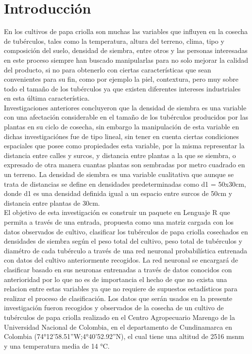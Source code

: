 

\chapter*{Introducci\'on}

En los cultivos de papa criolla son muchas las variables que influyen en la cosecha de tub\'erculos, tales como la temperatura, altura del terreno, clima, tipo y composici\'on del suelo, densidad de siembra, entre otros y las personas interesadas en este proceso siempre han buscado manipularlas para no solo mejorar la calidad del producto, si no para obtenerlo con ciertas caracter\'isticas que sean convenientes para su fin, como por ejemplo la piel, contextura, pero muy sobre todo el tama\~no de los tub\'erculos ya que existen diferentes intereses industriales en esta \'ultima caracter\'istica.\\

Investigaciones anteriores concluyeron que la densidad de siembra es una variable con una afectaci\'on considerable en el tama\~no de los tub\'erculos producidos por las plantas en su ciclo de cosecha, sin embargo la manipulaci\'on de esta variable en dichas investigaci\'ones fue de tipo lineal, sin tener en cuenta ciertas condiciones espaciales que posee como propiedades esta variable, por la misma representar la distancia entre calles y surcos, y distancia entre plantas a la que se siembra, o expresado de otra manera cuantas plantas son sembradas por metro cuadrado en un terreno. La densidad de siembra es una variable cualitativa que aunque se trata de distancias se define en densidades predeterminadas como d1 = 50x30cm, donde d1 es una densidad definida igual a un espacio entre surcos de 50cm y distancia entre plantas de 30cm.\\

El objetivo de esta investigaci\'on es construir un paquete en Lenguaje R que permita a trav\'es de una entrada, propuesta como una matriz cargada con los datos observados de cultivo, clasificar los tub\'erculos de papa criolla cosechados en densidades de siembra seg\'un el peso total del cultivo, peso total de tub\'erculos y diam\'etro de cada tub\'erculo a trav\'es de una red neuronal probabil\'istica entrenada con datos del cultivo anteriormente recogidos. La red neuronal se encargar\'a de clasificar basado en sus neuronas entrenadas a trav\'es de datos conocidos con anterioridad por lo que no es de importancia el hecho de que no exista una relacion entre estas variables ya que no requiere de supuestos estad\'isticos para realizar el proceso de clasificaci\'on. Los datos que ser\'an usados en la presente investigaci\'on fueron recogidos y observados de la cosecha de un cultivo de tub\'erculos de papa criolla realizado en el Centro Agropecuario Marengo de la Universidad Nacional de Colombia, en el departamento de Cundinamarca en Colombia (74°12'58.51''W;4°40'52.92''N), el cual tiene una altitud de 2516 msnm y una temperatura media de 14 °C.\\
 

